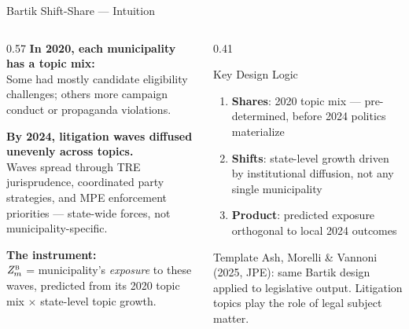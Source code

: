 \documentclass[aspectratio=169,10pt]{beamer}
\newcommand{\bZ}{\mathit{Z}_{m}^{\textsc{b}}}
\begin{document}
\begin{frame}{Bartik Shift-Share --- Intuition}
\begin{columns}[T]
\begin{column}{0.57\textwidth}
\textbf{In 2020, each municipality has a topic mix:}\\
Some had mostly candidate eligibility challenges; others more campaign conduct or propaganda violations.
\medskip

\textbf{By 2024, litigation waves diffused unevenly across topics.}\\
Waves spread through TRE jurisprudence, coordinated party strategies, and MPE enforcement priorities --- state-wide forces, not municipality-specific.
\medskip

\textbf{The instrument:}\\
$\bZ$ = municipality's \emph{exposure} to these waves, predicted from its 2020 topic mix $\times$ state-level topic growth.
\end{column}
\begin{column}{0.41\textwidth}
\begin{alertblock}{Key Design Logic}
  \footnotesize
  \begin{enumerate}\itemsep2pt
    \item \textbf{Shares}: 2020 topic mix --- pre-determined, before 2024 politics materialize
    \item \textbf{Shifts}: state-level growth driven by institutional diffusion, not any single municipality
    \item \textbf{Product}: predicted exposure orthogonal to local 2024 outcomes
  \end{enumerate}
\end{alertblock}
\vspace{4pt}
\begin{block}{Template}
  \footnotesize Ash, Morelli \& Vannoni (2025, JPE): same Bartik design applied to legislative output. Litigation topics play the role of legal subject matter.
\end{block}
\end{column}
\end{columns}
\end{frame}
\end{document}
